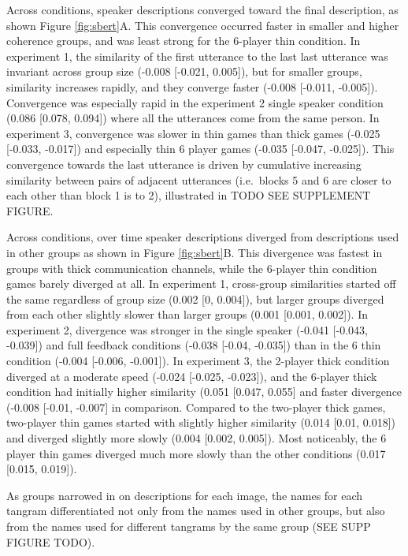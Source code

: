 \documentclass[
  english,
  a4paper,
]{article}
\begin{document}
Across conditions, speaker descriptions converged toward the final description, as shown Figure \ref{fig:sbert}A. This convergence occurred faster in smaller and higher coherence groups, and was least strong for the 6-player thin condition. In experiment 1, the similarity of the first utterance to the last last utterance was invariant across group size (-0.008 {[}-0.021, 0.005{]}), but for smaller groups, similarity increases rapidly, and they converge faster (-0.008 {[}-0.011, -0.005{]}). Convergence was especially rapid in the experiment 2 single speaker condition (0.086 {[}0.078, 0.094{]}) where all the utterances come from the same person. In experiment 3, convergence was slower in thin games than thick games (-0.025 {[}-0.033, -0.017{]}) and especially thin 6 player games (-0.035 {[}-0.047, -0.025{]}). This convergence towards the last utterance is driven by cumulative increasing similarity between pairs of adjacent utterances (i.e.~blocks 5 and 6 are closer to each other than block 1 is to 2), illustrated in TODO SEE SUPPLEMENT FIGURE.

Across conditions, over time speaker descriptions diverged from descriptions used in other groups as shown in Figure \ref{fig:sbert}B. This divergence was fastest in groups with thick communication channels, while the 6-player thin condition games barely diverged at all. In experiment 1, cross-group similarities started off the same regardless of group size (0.002 {[}0, 0.004{]}), but larger groups diverged from each other slightly slower than larger groups (0.001 {[}0.001, 0.002{]}). In experiment 2, divergence was stronger in the single speaker (-0.041 {[}-0.043, -0.039{]}) and full feedback conditions (-0.038 {[}-0.04, -0.035{]}) than in the 6 thin condition (-0.004 {[}-0.006, -0.001{]}). In experiment 3, the 2-player thick condition diverged at a moderate speed (-0.024 {[}-0.025, -0.023{]}), and the 6-player thick condition had initially higher similarity (0.051 {[}0.047, 0.055{]} and faster divergence (-0.008 {[}-0.01, -0.007{]} in comparison. Compared to the two-player thick games, two-player thin games started with slightly higher similarity (0.014 {[}0.01, 0.018{]}) and diverged slightly more slowly (0.004 {[}0.002, 0.005{]}). Most noticeably, the 6 player thin games diverged much more slowly than the other conditions (0.017 {[}0.015, 0.019{]}).

As groups narrowed in on descriptions for each image, the names for each tangram differentiated not only from the names used in other groups, but also from the names used for different tangrams by the same group (SEE SUPP FIGURE TODO).
\end{document}
